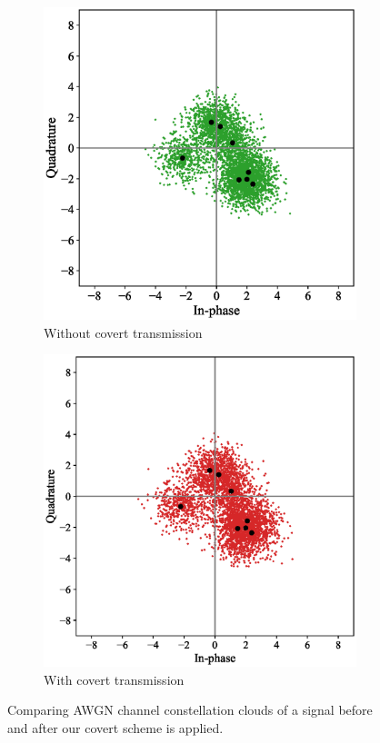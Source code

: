 \begin{figure}[bp!]
	\begin{subfigure}{0.24\textwidth}
		\includegraphics[width=\linewidth]{figs/awgn_normal_constellation}
		\caption{Without covert transmission}
	\end{subfigure}
	\hfill
	\begin{subfigure}{0.24\textwidth}
		\includegraphics[width=\linewidth]{figs/awgn_covert_constellation}
		\caption{With covert transmission}	
	\end{subfigure}
	\caption{Comparing AWGN channel constellation clouds of a signal before and after our covert scheme is applied.}
	\label{fig:awgn_constellation}
\end{figure}
